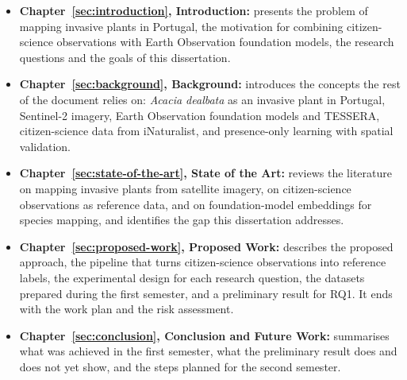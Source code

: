 \begin{itemize}
  \item \textbf{Chapter~\ref{sec:introduction}, Introduction:}
  presents the problem of mapping invasive plants in Portugal, the
  motivation for combining citizen-science observations with Earth
  Observation foundation models, the research questions and the goals
  of this dissertation.
  \item \textbf{Chapter~\ref{sec:background}, Background:} introduces
  the concepts the rest of the document relies on: \emph{Acacia
  dealbata} as an invasive plant in Portugal, Sentinel-2 imagery,
  Earth Observation foundation models and TESSERA, citizen-science
  data from iNaturalist, and presence-only learning with spatial
  validation.
  \item \textbf{Chapter~\ref{sec:state-of-the-art}, State of the
  Art:} reviews the literature on mapping invasive plants from
  satellite imagery, on citizen-science observations as reference
  data, and on foundation-model embeddings for species mapping, and
  identifies the gap this dissertation addresses.
  \item \textbf{Chapter~\ref{sec:proposed-work}, Proposed Work:}
  describes the proposed approach, the pipeline that turns
  citizen-science observations into reference labels, the
  experimental design for each research question, the datasets
  prepared during the first semester, and a preliminary result for
  RQ1. It ends with the work plan and the risk assessment.
  \item \textbf{Chapter~\ref{sec:conclusion}, Conclusion and Future
  Work:} summarises what was achieved in the first semester, what the
  preliminary result does and does not yet show, and the steps planned
  for the second semester.
\end{itemize}
